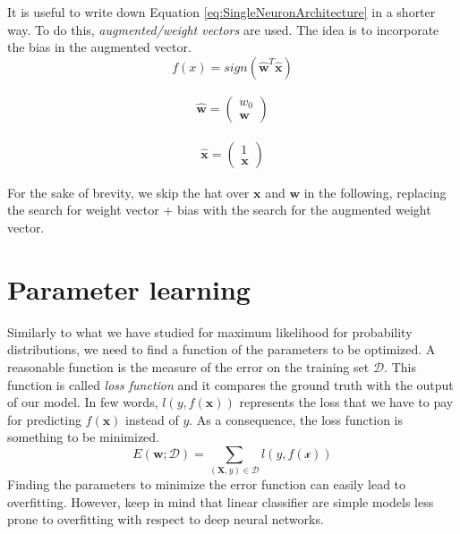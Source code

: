 It is useful to write down Equation \ref{eq:SingleNeuronArchitecture} in a shorter way. To do this, \textit{augmented/weight vectors} are used. The idea is to incorporate the bias in the augmented vector.
\begin{equation}
    f(x) = \mathit{sign}(\pmb{\hat{w}}^T \pmb{\hat{x}})
\end{equation}

\begin{align}
    \pmb{\hat{w}} =
    \begin{pmatrix}
        w_0 \\
        \pmb{w}
    \end{pmatrix}
\end{align}

\begin{align}
    \pmb{\hat{x}} =
    \begin{pmatrix}
        1 \\
        \pmb{x}
    \end{pmatrix}
\end{align}

For the sake of brevity, we skip the hat over $\pmb{x}$ and $\pmb{w}$ in the following, replacing the search for weight vector + bias with the search for the augmented weight vector.

\section{Parameter learning}
Similarly to what we have studied for maximum likelihood for probability distributions, we need to find a function of the parameters to be optimized. A reasonable function is the measure of the error on the training set $\mathcal{D}$. This function is called \textit{loss function} and it compares the ground truth with the output of our model. In few words, $l(y, f(\pmb{x}))$ represents the loss that we have to pay for predicting $f(\pmb{x})$ instead of $y$. As a consequence, the loss function is something to be minimized.
\begin{equation}
    \label{eq:parameterLearning_errorMinimization}
    E(\pmb{w}; \mathcal{D}) = \sum_{(\pmb{X},y) \in \mathcal{D}} l(y, f(\mathcal{x}))
\end{equation}
Finding the parameters to minimize the error function can easily lead to overfitting. However, keep in mind that linear classifier are simple models less prone to overfitting with respect to deep neural networks.

